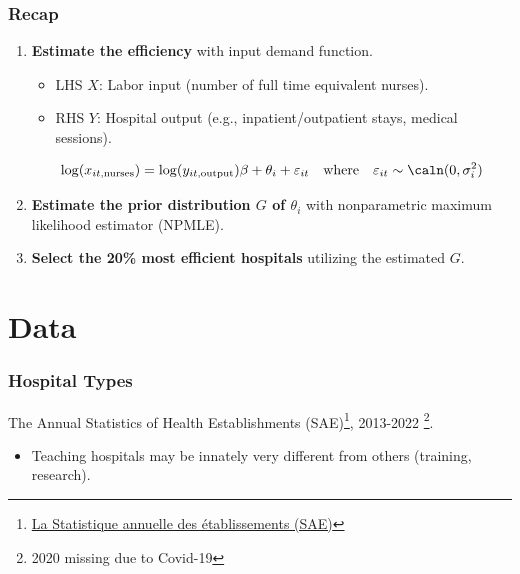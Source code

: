 \documentclass[10pt,mathserif,aspectratio=169]{beamer}
\begin{document}
\begin{frame}
  \frametitle{Recap}
  \begin{enumerate}\itemsep=12pt
    \item \textbf{Estimate the efficiency} with input demand function.
          \begin{itemize} \itemsep=8pt
            \item LHS $X$: Labor input (number of full time equivalent nurses).
            \item RHS $Y$: Hospital output (e.g., inpatient/outpatient stays, medical sessions).
          \end{itemize}
          \begin{equation*}
            \log(x_{it,\text{nurses}}) = \log(y_{it,\text{output}})\beta +\theta_i +\varepsilon_{it} \quad \text{where}\quad \varepsilon_{it} \sim \caln(0,\sigma_i^2)
          \end{equation*}
    \item \textbf{Estimate the prior distribution $G$ of $\theta_i$} with nonparametric maximum likelihood estimator (NPMLE).
    \item \textbf{Select the 20\% most efficient hospitals} utilizing the estimated $G$.

  \end{enumerate}
\end{frame}

\section{Data}

\begin{frame}
  \frametitle{Hospital Types}
  The Annual Statistics of Health
  Establishments
  (SAE)\footnote{\href{https://data.drees.solidarites-sante.gouv.fr/explore/dataset/708_bases-statistiques-sae/information/}{La
      Statistique annuelle des établissements (SAE)}}, 2013-2022 \footnote{2020 missing due to Covid-19}.
  \begin{table}

    \begin{adjustbox}{width=0.8\textwidth,center}
      \centering
      
    \end{adjustbox}
    \begin{itemize}\itemsep = 8pt
      \item Teaching hospitals may be innately very different from others (training,
            research). \\ \hyperlink{reg_sep}{}
    \end{itemize}
  \end{table}
\end{frame}
\end{document}
